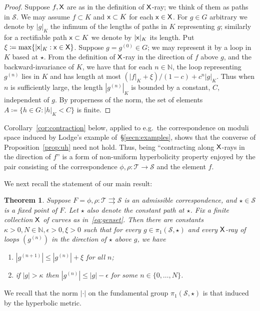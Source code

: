 \documentclass{amsart}
\newcommand\N{{\mathbb{N}}}
\newtheorem{mainthm}{Theorem}\renewcommand\themainthm{\Alph{mainthm}}
\theoremstyle{definition}
\theoremstyle{remark}
\newcommand{\sfX}{{\sf X}}
\newcommand{\sfx}{{\sf x}}
\newcommand{\cT}{\mathcal{T}}
\newcommand{\cS}{\mathcal{S}}
\begin{document}
\begin{proof}
  Suppose $f, \sfX$ are as in the definition of $\sfX$-ray; we think of them as paths in $\cS$.  We may assume $f \subset K$ and $\sfx \subset K$ for each $\sfx \in \sfX$. For $g\in G$ arbitrary we denote by $|g|_K$ the infimum of the lengths of paths in $K$ representing $g$; similarly for a rectifiable path $\sfx \subset K$ we denote by $|\sfx|_K$ its length.  Put $\xi\coloneqq\max\{|\sfx|_K : \sfx\in \sfX\}$.   Suppose $g=g^{(0)}\in G$; we may represent it by a loop in $K$ based at $\star$.  From the definition of $\sfX$-ray in the direction of $f$ above $g$, and the backward-invariance of $K$, we have that for each $n\in \N$, the loop representing $g^{(n)}$ lies in $K$ and has length at most $(|f|_K+\xi)/(1-c)+c^{n}|g|_K$.  Thus when $n$ is sufficiently large, the length $|g^{(n)}|_K$ is bounded by a constant, $C$, independent of $g$. By properness of the norm, the set of elements $A\coloneqq\{h\in G : |h|_K<C\}$ is finite.
\end{proof}

Corollary~\ref{cor:contraction} below, applied to e.g.\ the correspondence on moduli space induced by Lodge's example of~\S\ref{secn:examples}, shows that the converse of Proposition~\ref{prop:uh} need not hold.  Thus, being ``contracting along  $\sfX$-rays in the direction of $f$'' is a form of non-uniform hyperbolicity property enjoyed by the pair consisting of the correspondence $\phi, \rho\colon \cT \to \cS$ and the element $f$.  

We next recall the statement of our main result:
\setcounter{mainthm}{2}
\begin{mainthm}
  Suppose $F=\phi, \rho\colon \cT \rightrightarrows\cS$ is an admissible correspondence, and $\star\in \cS$ is a fixed point of $F$.  Let $\star$ also denote the constant path at $\star$.  Fix a finite collection $\sfX$ of curves as in~\eqref{eq:genset}. Then there are constants $\kappa>0,N\in\N,\epsilon>0,\xi>0$ such that for every $g\in \pi_1(\cS, \star)$ and every $\sfX$-ray of loops $(g^{(n)})$ in the direction of $\star$ above $g$, we have
  \begin{enumerate}
  \item $|g^{(n+1)}|\le|g^{(n)}|+\xi$ for all $n$;\label{mainthm:1}
   \item if $|g|>\kappa$ then $|g^{(n)}|\le |g|-\epsilon$ for some $n\in\{0,\dots,N\}$. \label{mainthm:2}
  \end{enumerate}
\end{mainthm}
We recall that the norm $|\cdot|$ on the fundamental group $\pi_1(\cS, \star)$ is that induced by the hyperbolic metric.
\end{document}
